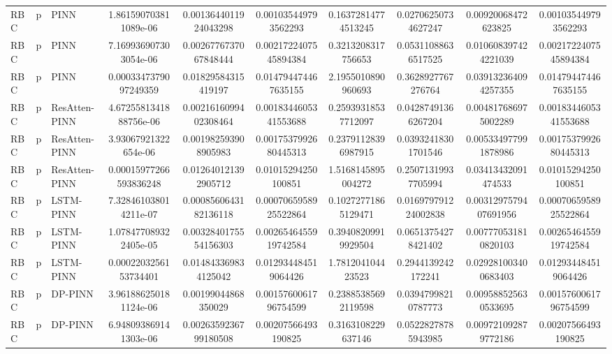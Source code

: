 \begin{landscape}
\begin{longtable}{lllccccccc}
 RBC &     p &           PINN &  1.861590703811089e-06 &  0.0013644011924043298 &   0.001035449793562293 &  0.16372814774513245 &   0.02706250734627247 &   0.00920068472623825 &   0.001035449793562293 \\
 RBC &     p &           PINN &  7.169936907303054e-06 &  0.0026776737067848444 &  0.0021722407545894384 &   0.3213208317756653 &   0.05311088636517525 &  0.010608397424221039 &  0.0021722407545894384 \\
 RBC &     p &           PINN &  0.0003347379097249359 &    0.01829584315419197 &   0.014794474467635155 &   2.1955010890960693 &    0.3628927767276764 &  0.039132364094257355 &   0.014794474467635155 \\
 RBC &     p &  ResAtten-PINN & 4.6725581341888756e-06 &  0.0021616099402308464 &  0.0018344605341553688 &  0.25939318537712097 &   0.04287491366267204 &  0.004817686975002289 &  0.0018344605341553688 \\
 RBC &     p &  ResAtten-PINN &   3.93067921322654e-06 &   0.001982593908905983 &  0.0017537992680445313 &  0.23791128396987915 &   0.03932418301701546 &  0.005334977991878986 &  0.0017537992680445313 \\
 RBC &     p &  ResAtten-PINN & 0.00015977266593836248 &   0.012640121392905712 &    0.01015294250100851 &   1.5168145895004272 &   0.25071319937705994 &   0.03413432091474533 &    0.01015294250100851 \\
 RBC &     p &      LSTM-PINN &  7.328461038014211e-07 &  0.0008560643182136118 &  0.0007065958925522864 &  0.10272771865129471 &  0.016979791224002838 & 0.0031297579407691956 &  0.0007065958925522864 \\
 RBC &     p &      LSTM-PINN &  1.078477089322405e-05 &  0.0032840175554156303 &  0.0026546455919742584 &  0.39408209919929504 &   0.06513754278421402 &  0.007770531810820103 &  0.0026546455919742584 \\
 RBC &     p &      LSTM-PINN &  0.0002203256153734401 &   0.014843369834125042 &   0.012934484519064426 &    1.781204104423523 &    0.2944139242172241 &  0.029281003400683403 &   0.012934484519064426 \\
 RBC &     p &        DP-PINN &  3.961886250181124e-06 &    0.00199044868350029 &  0.0015760061796754599 &  0.23885385692119598 &   0.03947998210787773 &  0.009588525630533695 &  0.0015760061796754599 \\
 RBC &     p &        DP-PINN &  6.948093869141303e-06 &  0.0026359236799180508 &    0.00207566493190825 &   0.3163108229637146 &   0.05228278785943985 &  0.009721092879772186 &    0.00207566493190825 \\

\end{longtable}
\end{landscape}
